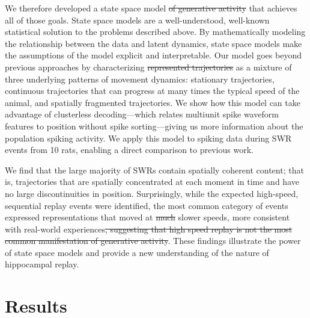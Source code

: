\documentclass[9pt,lineno]{elife}
\providecommand{\DIFadd}[1]{{\protect\color{blue}\uwave{#1}}} %
\providecommand{\DIFdel}[1]{{\protect\color{red}\sout{#1}}}                      %
\providecommand{\DIFaddbegin}{} %
\providecommand{\DIFaddend}{} %
\providecommand{\DIFdelbegin}{} %
\providecommand{\DIFdelend}{} %
\newcommand{\DIFscaledelfig}{0.5}
\newlength{\DIFdelgraphicswidth} %
\newlength{\DIFdelgraphicsheight} %
\newcommand{\DIFaddincludegraphics}[2][]{{\color{blue}\fbox{\DIFOincludegraphics[#1]{#2}}}} %
\newcommand{\DIFdelincludegraphics}[2][]{%
\sbox{\DIFdelgraphicsbox}{\DIFOincludegraphics[#1]{#2}}%
\settoboxwidth{\DIFdelgraphicswidth}{\DIFdelgraphicsbox} %
\settoboxtotalheight{\DIFdelgraphicsheight}{\DIFdelgraphicsbox} %
\scalebox{\DIFscaledelfig}{%
\parbox[b]{\DIFdelgraphicswidth}{\usebox{\DIFdelgraphicsbox}\\[-\baselineskip] \rule{\DIFdelgraphicswidth}{0em}}\llap{\resizebox{\DIFdelgraphicswidth}{\DIFdelgraphicsheight}{%
\setlength{\unitlength}{\DIFdelgraphicswidth}%
\begin{picture}(1,1)%
\thicklines\linethickness{2pt} %
{\color[rgb]{1,0,0}\put(0,0){\framebox(1,1){}}}%
{\color[rgb]{1,0,0}\put(0,0){\line( 1,1){1}}}%
{\color[rgb]{1,0,0}\put(0,1){\line(1,-1){1}}}%
\end{picture}%
}\hspace*{3pt}}} %
} %
\DeclareRobustCommand{\DIFaddbegin}{\DIFOaddbegin \let\includegraphics\DIFaddincludegraphics} %
\DeclareRobustCommand{\DIFaddend}{\DIFOaddend \let\includegraphics\DIFOincludegraphics} %
\DeclareRobustCommand{\DIFdelbegin}{\DIFOdelbegin \let\includegraphics\DIFdelincludegraphics} %
\DeclareRobustCommand{\DIFdelend}{\DIFOaddend \let\includegraphics\DIFOincludegraphics} %
\begin{document}
We therefore developed a state space model \DIFdelbegin \DIFdel{of generative activity }\DIFdelend that achieves all of those goals. State space models are a well-understood, well-known statistical solution to the problems described above. By mathematically modeling the relationship between the data and latent dynamics, state space models make the assumptions of the model explicit and interpretable. Our model goes beyond previous approaches \citep{MaboudiUncoveringtemporalstructure2018, DengRapidclassificationhippocampal2016} by characterizing \DIFdelbegin \DIFdel{represented trajectories }\DIFdelend \DIFaddbegin \DIFadd{the spatial representations during SWRs }\DIFaddend as a mixture of three underlying patterns of movement dynamics: stationary trajectories, continuous trajectories that can progress at many times the typical speed of the animal, and spatially fragmented trajectories. We show how this model can take advantage of clusterless decoding---which relates multiunit spike waveform features to position without spike sorting---giving us more information about the population spiking activity. We apply this model to spiking data during SWR events from 10 rats, enabling a direct comparison to previous work.

We find that the large majority of SWRs contain spatially coherent content; that is, trajectories that are spatially concentrated at each moment in time and have no large discontinuities in position. Surprisingly, while the expected high-speed, sequential replay events were identified, the most common category of events expressed representations that moved at \DIFdelbegin \DIFdel{much }\DIFdelend slower speeds, more consistent with real-world experiences\DIFdelbegin \DIFdel{, suggesting that high speed replay is not the most common manifestation of generative activity}\DIFdelend . These findings illustrate the power of state space models and provide a new understanding of the nature of hippocampal replay.

\section*{Results}
\end{document}
